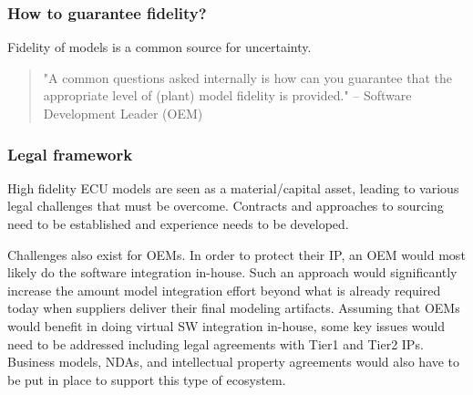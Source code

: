 \subsubsection{How to guarantee fidelity?}
Fidelity of models is a common source for uncertainty.
\begin{quote}
"A common questions asked internally is how can you guarantee that the appropriate level of (plant) model fidelity is provided." 
-- Software Development Leader (OEM)
\end{quote}

\subsubsection{Legal framework}
High fidelity ECU models are seen as a material/capital asset, leading to various legal challenges that must be overcome. Contracts and approaches to sourcing need to be established and experience needs to be developed.

Challenges also exist for OEMs. In order to protect their IP, an OEM would most likely do the software integration in-house. Such an approach would significantly increase the amount model integration effort beyond what is already required today when suppliers deliver their final modeling artifacts.
Assuming that OEMs would benefit in doing virtual SW integration in-house, some key issues would need to be addressed including legal agreements with Tier1 and Tier2 IPs. Business models, NDAs, and intellectual property agreements would also have to be put in place to support this type of ecosystem.
